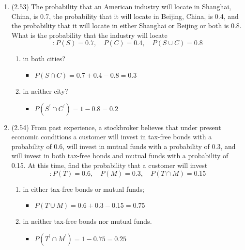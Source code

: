 \documentclass[basic, header]{nosvagor-notes} \usepackage{nosvagor-math}
\begin{document}
\begin{enumerate}[itemsep=8em]
  \item (2.53) The probability that an American industry will locate in
    Shanghai, China, is 0.7, the probability that it will locate in Beijing,
    China, is 0.4, and the probability that it will locate in either Shanghai
    or Beijing or both is 0.8. What is the probability that the industry will
    locate
    \[%
    : P(S) = 0.7, \quad P(C) = 0.4, \quad P(S \cup C) = 0.8
    \]%
    \begin{enumerate}
      \item in both cities?
        \begin{itemize}
          \item \(P(S \cap C) = 0.7 + 0.4 - 0.8 = 0.3\)

        \end{itemize}

      \item in neither city?
        \begin{itemize}
          \item \(P(S^{'} \cap C^{'}) = 1 - 0.8 = 0.2\)

        \end{itemize}

    \end{enumerate}

  \newpage %

  \item (2.54) From past experience, a stockbroker believes that under
    present economic conditions a customer will invest in tax-free bonds with a
    probability of 0.6, will invest in mutual funds with a probability of 0.3,
    and will invest in both tax-free bonds and mutual funds with a probability
    of 0.15. At this time, find the probability that a customer will invest
    \[%
      : P(T) = 0.6, \quad P(M) = 0.3, \quad P(T \cap M) = 0.15
    \]%
    \begin{enumerate}
      \item in either tax-free bonds or mutual funds;
        \begin{itemize}
          \item \(P(T \cup M) = 0.6 + 0.3 - 0.15 = 0.75\)
        \end{itemize}

      \item in neither tax-free bonds nor mutual funds.
        \begin{itemize}
          \item \(P(T^{'} \cap M^{'}) = 1 - 0.75 = 0.25\)



\end{itemize}
\end{enumerate}
\end{enumerate}
\end{document}
